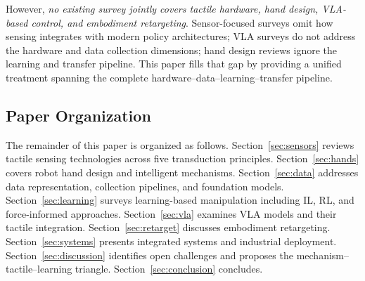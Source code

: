However, \emph{no existing survey jointly covers tactile hardware, hand design, VLA-based control, and embodiment retargeting}. Sensor-focused surveys omit how sensing integrates with modern policy architectures; VLA surveys do not address the hardware and data collection dimensions; hand design reviews ignore the learning and transfer pipeline. This paper fills that gap by providing a unified treatment spanning the complete hardware--data--learning--transfer pipeline.

\subsection{Paper Organization}

The remainder of this paper is organized as follows. Section~\ref{sec:sensors} reviews tactile sensing technologies across five transduction principles. Section~\ref{sec:hands} covers robot hand design and intelligent mechanisms. Section~\ref{sec:data} addresses data representation, collection pipelines, and foundation models. Section~\ref{sec:learning} surveys learning-based manipulation including IL, RL, and force-informed approaches. Section~\ref{sec:vla} examines VLA models and their tactile integration. Section~\ref{sec:retarget} discusses embodiment retargeting. Section~\ref{sec:systems} presents integrated systems and industrial deployment. Section~\ref{sec:discussion} identifies open challenges and proposes the mechanism--tactile--learning triangle. Section~\ref{sec:conclusion} concludes.
